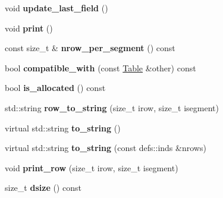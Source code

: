 \begin{DoxyCompactItemize}
\item 
void {\bfseries update\+\_\+last\+\_\+field} ()\hypertarget{classTable_aa2ce71f46592e9be6f7221bc437d78f5}{}\label{classTable_aa2ce71f46592e9be6f7221bc437d78f5}

\item 
void {\bfseries print} ()\hypertarget{classTable_a0de5a9ca880b662ec7d608de686e309a}{}\label{classTable_a0de5a9ca880b662ec7d608de686e309a}

\item 
const size\+\_\+t \& {\bfseries nrow\+\_\+per\+\_\+segment} () const \hypertarget{classTable_a57ea2435e26974ec1aaa08772efc2e5e}{}\label{classTable_a57ea2435e26974ec1aaa08772efc2e5e}

\item 
bool {\bfseries compatible\+\_\+with} (const \hyperlink{classTable}{Table} \&other) const \hypertarget{classTable_a76d23a26905cc9b22f517c46bb388154}{}\label{classTable_a76d23a26905cc9b22f517c46bb388154}

\item 
bool {\bfseries is\+\_\+allocated} () const \hypertarget{classTable_ade2e3f7fc753c742d0157cebd1006216}{}\label{classTable_ade2e3f7fc753c742d0157cebd1006216}

\item 
std\+::string {\bfseries row\+\_\+to\+\_\+string} (size\+\_\+t irow, size\+\_\+t isegment)\hypertarget{classTable_ad08b3c049f18fe78e8558ed6a3a94873}{}\label{classTable_ad08b3c049f18fe78e8558ed6a3a94873}

\item 
virtual std\+::string {\bfseries to\+\_\+string} ()\hypertarget{classTable_ad6ab7c958c808b878cabd61e8df65e9f}{}\label{classTable_ad6ab7c958c808b878cabd61e8df65e9f}

\item 
virtual std\+::string {\bfseries to\+\_\+string} (const defs\+::inds \&nrows)\hypertarget{classTable_a7d8bd3433b4246a185058898632a2071}{}\label{classTable_a7d8bd3433b4246a185058898632a2071}

\item 
void {\bfseries print\+\_\+row} (size\+\_\+t irow, size\+\_\+t isegment)\hypertarget{classTable_ad7833264b3f9885c5477aaf5e97ca508}{}\label{classTable_ad7833264b3f9885c5477aaf5e97ca508}

\item 
size\+\_\+t {\bfseries dsize} () const \hypertarget{classTable_af0e08f84a00fa71c68194858ed58f925}{}\label{classTable_af0e08f84a00fa71c68194858ed58f925}

\end{DoxyCompactItemize}
